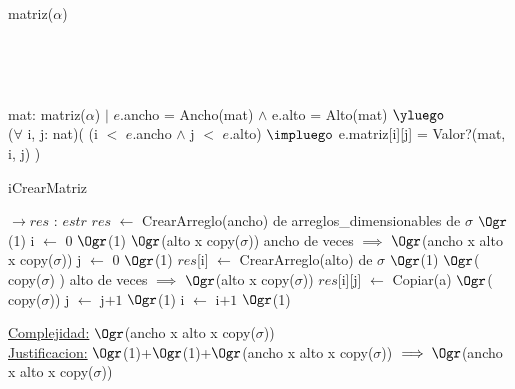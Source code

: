 \begin{Representacion}
	
	
	\begin{Estructura}{matriz($\alpha$)}
		 \begin{Tupla}[estr]
			\\
			
		\end{Tupla}
	\end{Estructura}
	
	
	~	
	
	{mat: matriz($\alpha$) $|$ $e$.ancho = Ancho(mat) $\land$ e.alto = Alto(mat) $\yluego$\\
	($\forall$ i, j: nat)( (i $<$ $e$.ancho $\land$ j $<$ $e$.alto) $\impluego$ e.matriz[i][j] = Valor?(mat, i, j) )}
	
\begin{Algoritmos}
	
	\begin{algorithm}[H]
		\caption{iCrearMatriz}
		
		\begin{algorithmic}[1]
			 $\to res$ : $estr$
			\State $res$ $\leftarrow$ CrearArreglo(ancho) de arreglos\_dimensionables de $\sigma$ \Comment $\Ogr$(1)
			\State i $\leftarrow$ $0$ \Comment $\Ogr$(1)
			 \Comment $\Ogr$(alto x copy($\sigma$)) ancho de veces $\implies$ $\Ogr$(ancho x alto x copy($\sigma$))
				\State j $\leftarrow$ $0$ \Comment $\Ogr$(1)
				\State $res$[i] $\leftarrow$ CrearArreglo(alto) de $\sigma$ \Comment $\Ogr$(1)
				 \Comment $\Ogr$( copy($\sigma$) ) alto de veces $\implies$  $\Ogr$(alto x copy($\sigma$))
					\State $res$[i][j] $\leftarrow$ Copiar(a) \Comment $\Ogr$( copy($\sigma$))
					\State j $\leftarrow$ j$+1$ \Comment $\Ogr$(1)
				\EndWhile
				\State i $\leftarrow$ i$+1$ \Comment $\Ogr$(1)
			\EndWhile
			\EndProcedure
		\end{algorithmic}
		\underline{Complejidad:} $\Ogr$(ancho x alto x copy($\sigma$))
		\\
		\underline{Justificacion:} $\Ogr$(1)+$\Ogr$(1)+$\Ogr$(ancho x alto x copy($\sigma$)) $\implies \Ogr$(ancho x alto x copy($\sigma$))
		

\end{algorithm}
\end{Algoritmos}
\end{Representacion}
